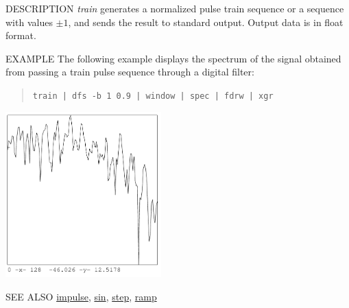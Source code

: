 \begin{synopsis}
\item[train] [ --l $L$ ] [ --p $P$ ]
\end{synopsis}

\begin{qsection}{DESCRIPTION}
{\em train} generates a normalized pulse train sequence 
or a sequence with values $\pm 1$, 
and sends the result to standard output.
Output data is in float format.
\end{qsection}

\begin{options}
\end{options}

\begin{qsection}{EXAMPLE}
The following example displays the spectrum of
the signal obtained from passing a train pulse sequence through
a digital filter:
\begin{quote}
\verb!train | dfs -b 1 0.9 | window | spec | fdrw | xgr!
\end{quote}
\begin{center}
\includegraphics[width=6cm]{fig/train.pdf}
\end{center}
\end{qsection}

\begin{qsection}{SEE ALSO}
\hyperlink{impulse}{impulse},
\hyperlink{sin}{sin},
\hyperlink{step}{step},
\hyperlink{ramp}{ramp}
\end{qsection}


